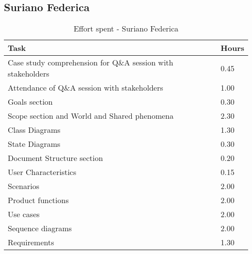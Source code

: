 \subsection{Suriano Federica}
\renewcommand{\arraystretch}{2}
\begin{longtable}{|m{9cm}|m{1.2cm}|}
\caption{Effort spent - Suriano Federica}\\
\hline
\endfirsthead
\endhead
\hline
\endlastfoot
\rowcolor{green2}
\textbf{Task} &\hfil {\textbf{Hours}}\\
\hline
Case study comprehension for Q\&A session with stakeholders & \hfil 0.45\\
Attendance of Q\&A session with stakeholders & \hfil 1.00\\
Goals section & \hfil 0.30\\
Scope section and World and Shared phenomena & \hfil 2.30\\
Class Diagrams & \hfil 1.30\\
State Diagrams & \hfil 0.30\\
Document Structure section & \hfil 0.20\\
User Characteristics & \hfil 0.15\\
Scenarios  & \hfil 2.00\\
Product functions & \hfil 2.00\\
Use cases & \hfil 2.00\\
Sequence diagrams & \hfil 2.00\\
Requirements & \hfil 1.30\\
\hline
\end{longtable}
